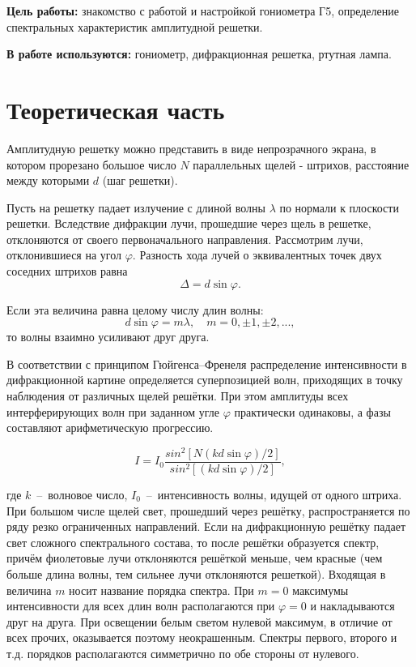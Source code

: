 \documentclass{letask}
\begin{document}


\textbf{Цель работы:} знакомство с работой и настройкой гониометра Г5, определение спектральных характеристик амплитудной решетки.

\textbf{В работе используются:} гониометр, дифракционная решетка, ртутная лампа.

\section{Теоретическая часть}

Амплитудную решетку можно представить в виде непрозрачного экрана, в котором прорезано большое число $N$ параллельных щелей - штрихов, расстояние между которыми $d$ (шаг решетки).


Пусть на решетку падает излучение с длиной волны $\lambda$ по нормали к плоскости решетки. Вследствие дифракции лучи, прошедшие через щель в решетке, отклоняются от своего первоначального направления. Рассмотрим лучи, отклонившиеся на угол $\varphi$. Разность хода лучей о эквивалентных точек двух соседних штрихов равна 
\[ \Delta = d \sin \varphi .\]

Если эта величина равна целому числу длин волны:
\[ d \sin \varphi = m \lambda, \quad m = 0, \pm 1, \pm 2, ... ,\]
то волны взаимно усиливают друг друга.


В соответствии с принципом Гюйгенса–Френеля распределение интенсивности в дифракционной картине определяется суперпозицией волн, приходящих в точку наблюдения от различных щелей решётки. При этом амплитуды всех интерферирующих волн при заданном угле $\varphi$ практически одинаковы, а фазы составляют арифметическую прогрессию.


\[
I = I_0 \dfrac{sin^2[N(kd \sin{\varphi})/2]}{sin^2[(kd \sin{\varphi})/2]},
\]

где $k$~--~волновое число, $I_0$~--~интенсивность волны, идущей от одного штриха. При большом числе щелей свет, прошедший через решётку, распространяется по ряду резко ограниченных направлений. Если на дифракционную решётку падает свет сложного спектрального состава, то после решётки образуется спектр, причём фиолетовые лучи отклоняются решёткой меньше, чем красные (чем больше длина волны, тем сильнее лучи отклоняются решеткой). Входящая в величина $m$ носит название порядка спектра. При $m = 0$ максимумы интенсивности для всех длин волн располагаются при $\varphi = 0$ и накладываются друг на друга. При освещении белым светом нулевой максимум, в отличие от всех прочих, оказывается поэтому неокрашенным. Спектры первого, второго и т.д. порядков располагаются симметрично по обе стороны от нулевого.
\end{document}
